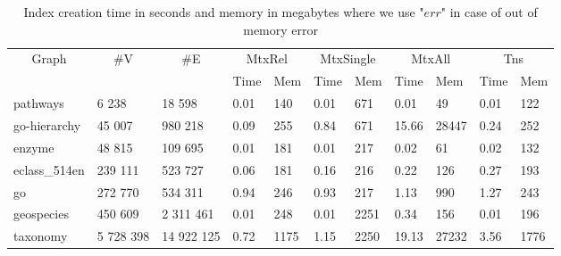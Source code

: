 	\begin{table}[t]
		{
			\caption{Index creation time in seconds and memory in megabytes where we use "$err$" in case of out of memory error }
			\label{tbl:index_creation}
			\small
			\begin{tabular}{|l|l|l|l|l|l|l|l|l|l|l|}
				\hline
				\multicolumn{1}{|c|}{\multirow{2}{*}{Graph}} & \multicolumn{1}{c|}{\multirow{2}{*}{\#V}} & \multicolumn{1}{c|}{\multirow{2}{*}{\#E}} &  \multicolumn{2}{c|}{MtxRel} & \multicolumn{2}{c|}{MtxSingle} & \multicolumn{2}{c|}{MtxAll} & \multicolumn{2}{c|}{Tns} \\ \cline{4-11} 
				\multicolumn{1}{|c|}{}                       & \multicolumn{1}{c|}{}                     & \multicolumn{1}{c|}{}                     & Time         & Mem          & Time        & Mem        & Time           & Mem           & Time         & Mem    \\ \hline
				pathways                                     & 6 238                                     & 18 598 & 0.01         & 140  & 0.01           & 671 & 0.01         & 49           & 0.01        & 122               \\ \hline
				go-hierarchy                                 & 45 007                                    & 980 218                                   & 0.09         & 255 & 0.84           & 671 & 15.66        & 28447        & 0.24        & 252                             \\ \hline
				enzyme                                       & 48 815                                    & 109 695                                   & 0.01         & 181 & 0.01           & 217 & 0.02         & 61           & 0.02        & 132                            \\ \hline
				eclass\_514en                                & 239 111                                   & 523 727                                   & 0.06         & 181 & 0.16           & 216    & 0.22         & 126          & 0.27        & 193                         \\ \hline
				go                                           & 272 770                                   & 534 311                                   & 0.94         & 246  & 0.93           & 217  & 1.13         & 990          & 1.27        & 243                          \\ \hline
				geospecies                                   & 450 609                                   & 2 311 461                   & 0.01         & 248 & 0.01           & 2251            & 0.34         & 156          & 0.01        & 196              \\ \hline
				taxonomy                                     & 5 728 398                                 & 14 922 125                            & 0.72         & 1175      & 1.15           & 2250    & 19.13        & 27232        & 3.56        & 1776                   \\ \hline
			\end{tabular}
		}
	\end{table}

